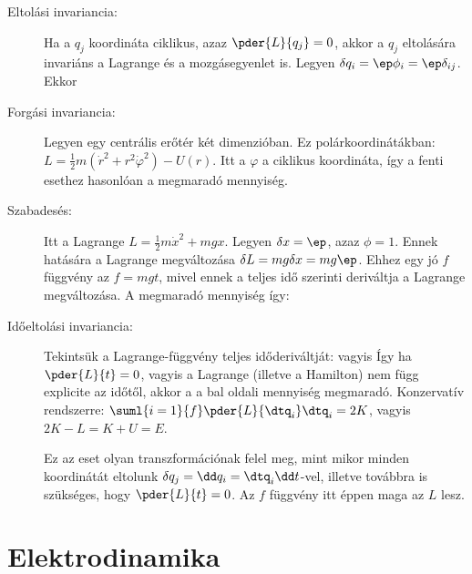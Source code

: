    \begin{description}
    \item[Eltolási invariancia:] Ha a $q_j$ koordináta ciklikus, azaz $\pder{L}{q_j}=0$, akkor a $q_j$ eltolására invariáns a Lagrange és a mozgásegyenlet is.
   Legyen $\delta q_i=\ep \phi_i=\ep\delta_{ij}$.
   Ekkor
    \item[Forgási invariancia:] Legyen egy centrális erőtér két dimenzióban.
   Ez polárkoordinátákban: $L=\frac{1}{2}m(\dot{r}^2+r^2\dot{\varphi}^2)-U(r)$.
   Itt a $\varphi$ a ciklikus koordináta, így a fenti esethez hasonlóan a
    megmaradó mennyiség. 
    \item[Szabadesés:] Itt a Lagrange $L=\frac{1}{2}m\dot{x}^2+mgx$.
   Legyen $\delta x=\ep$, azaz $\phi=1$.
   Ennek hatására a Lagrange megváltozása $\delta L=mg\delta x=mg\ep$.
   Ehhez egy jó $f$ függvény az $f=mgt$, mivel ennek a teljes idő szerinti deriváltja a Lagrange megváltozása.
   A megmaradó mennyiség így:
    \item[Időeltolási invariancia:] 
    Tekintsük a Lagrange-függvény teljes időderiváltját:
    vagyis
    Így ha $\pder{L}{t}=0$, vagyis a Lagrange (illetve a Hamilton) nem függ explicite az időtől, akkor a a bal oldali mennyiség megmaradó.
   Konzervatív rendszerre: $\suml{i=1}{f}\pder{L}{\dtq_i}\dtq_i=2 K$, vagyis $2K-L=K+U=E$.
    
    Ez az eset olyan transzformációnak felel meg, mint mikor minden koordinátát eltolunk $\delta q_j=\dd q_i=\dtq_i\dd t$-vel, illetve továbbra is szükséges, hogy  $\pder{L}{t}=0$.
   Az $f$ függvény itt éppen maga az $L$ lesz.
   \end{description}

 \section{Elektrodinamika}
  
